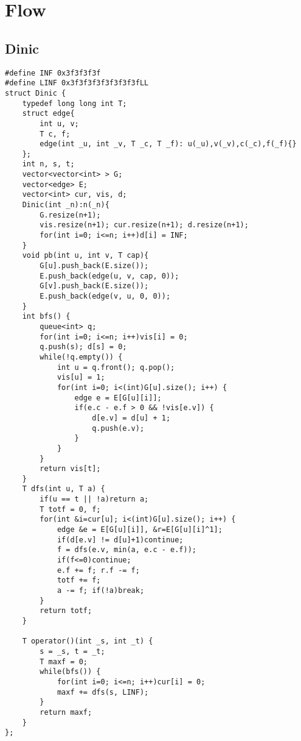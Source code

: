 \section{Flow}
\subsection{Dinic}
\begin{lstlisting}
#define INF 0x3f3f3f3f
#define LINF 0x3f3f3f3f3f3f3f3fLL
struct Dinic {
	typedef long long int T;
	struct edge{
		int u, v;
		T c, f;
		edge(int _u, int _v, T _c, T _f): u(_u),v(_v),c(_c),f(_f){}
	};
	int n, s, t;
	vector<vector<int> > G;
	vector<edge> E;
	vector<int> cur, vis, d;
	Dinic(int _n):n(_n){
		G.resize(n+1);
		vis.resize(n+1); cur.resize(n+1); d.resize(n+1);
		for(int i=0; i<=n; i++)d[i] = INF;
	}
	void pb(int u, int v, T cap){
		G[u].push_back(E.size());
		E.push_back(edge(u, v, cap, 0));
		G[v].push_back(E.size());
		E.push_back(edge(v, u, 0, 0));
	}
	int bfs() {
		queue<int> q;
		for(int i=0; i<=n; i++)vis[i] = 0;
		q.push(s); d[s] = 0;
		while(!q.empty()) {
			int u = q.front(); q.pop();
			vis[u] = 1;
			for(int i=0; i<(int)G[u].size(); i++) {
				edge e = E[G[u][i]];
				if(e.c - e.f > 0 && !vis[e.v]) {
					d[e.v] = d[u] + 1;
					q.push(e.v);
				}
			}
		}
		return vis[t];
	}
	T dfs(int u, T a) {
		if(u == t || !a)return a;
		T totf = 0, f;
		for(int &i=cur[u]; i<(int)G[u].size(); i++) {
			edge &e = E[G[u][i]], &r=E[G[u][i]^1];
			if(d[e.v] != d[u]+1)continue;
			f = dfs(e.v, min(a, e.c - e.f));
			if(f<=0)continue;
			e.f += f; r.f -= f;
			totf += f;
			a -= f; if(!a)break;
		}
		return totf;
	}

	T operator()(int _s, int _t) {
		s = _s, t = _t;
		T maxf = 0;
		while(bfs()) {
			for(int i=0; i<=n; i++)cur[i] = 0;
			maxf += dfs(s, LINF);
		}
		return maxf;
	}
};
\end{lstlisting}
